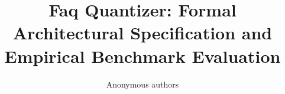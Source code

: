 \title{\textbf{Faq Quantizer: Formal Architectural Specification and Empirical Benchmark Evaluation}}

\author{Anonymous authors}
